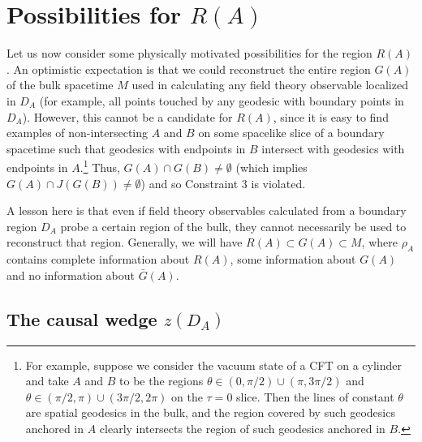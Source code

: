\documentclass[12pt]{article}
\renewcommand{\(}{\left(}
\renewcommand{\)}{\right)}
\begin{document}
\section{Possibilities for $R(A)$}

Let us now consider some physically motivated possibilities for the region $R(A)$. An optimistic expectation is that we could reconstruct the entire region $G(A)$ of the bulk spacetime $M$ used in calculating any field theory observable localized in $D_A$ (for example, all points touched by any geodesic with boundary points in $D_A$). However, this cannot be a candidate for $R(A)$, since it is easy to find examples of non-intersecting $A$ and $B$ on some spacelike slice of a boundary spacetime such that geodesics with endpoints in $B$ intersect with geodesics with endpoints in $A$.\footnote{For example, suppose we consider the vacuum state of a CFT on a cylinder and take $A$ and $B$ to be the regions $\theta \in (0,\pi/2)\cup(\pi,3 \pi/2)$ and $\theta \in (\pi/2,\pi) \cup (3\pi/2 , 2\pi)$ on the $\tau=0$ slice. Then the lines of constant $\theta$ are spatial geodesics in the bulk, and the region covered by such geodesics anchored in $A$ clearly intersects the region of such geodesics anchored in $B$.} Thus, $G(A) \cap G(B) \ne \emptyset$ (which implies $G(A) \cap J(G(B)) \ne \emptyset$) and so Constraint 3 is violated.

A lesson here is that even if field theory observables calculated from a boundary region $D_A$ probe a certain region of the bulk, they cannot necessarily be used to reconstruct that region. Generally, we will have $R(A) \subset G(A) \subset M$, where $\rho_A$ contains complete information about $R(A)$, some information about $G(A)$ and no information about $\bar{G}(A)$.

\subsection{The causal wedge $z(D_A)$}
\end{document}
